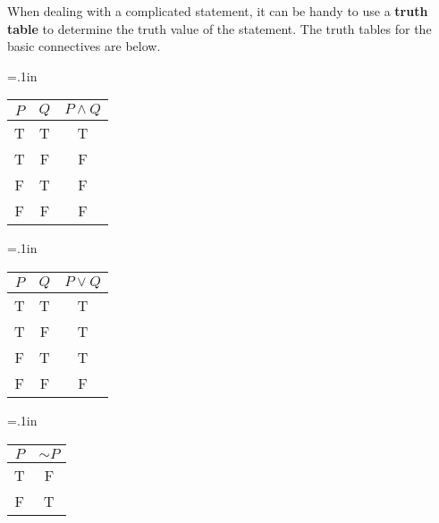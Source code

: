 \noindent When dealing with a complicated statement, it can be handy to use a \textbf{truth table} to determine the truth value of the statement.  The truth tables for the basic connectives are below.
\begin{multicols}{3}
{\tabulinesep=.1in
\begin{tabu}{|cc|c|}
\hline
$P$ & $Q$ & $P \wedge Q$ \\
\hline
T & T & T \\
T & F & F \\
F & T & F \\
F & F & F \\
\hline
\end{tabu}}

{\tabulinesep=.1in
\begin{tabu}{|cc|c|}
\hline
$P$ & $Q$ & $P \vee Q$ \\
\hline
T & T & T \\
T & F & T \\
F & T & T \\
F & F & F \\
\hline
\end{tabu}}

{\tabulinesep=.1in
\begin{tabu}{|c|c|}
\hline
$P$ & $\sim P$ \\
\hline
T & F \\
F & T \\
\hline
\end{tabu}}
\end{multicols}

\vspace{.5in}

